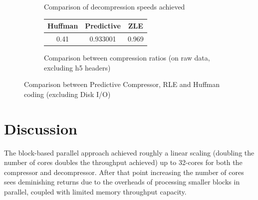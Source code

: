 \begin{figure}[ht!]
\begin{mdframed}
\begin{subfigure}[b]{0.6\textwidth}
  \caption{Comparison of decompression speeds achieved}
  \label{SPEED_CONCURRENT_COMPARISON_DECOMPRESSION}
  \end{subfigure}
  
  \begin{subfigure}[b]{0.7\textwidth}
    \centering
    \vspace{20pt}
    \begin{tabular}{|c|c|c|}
      \hline
      Huffman & Predictive & ZLE \\
      \hline
      0.41 & 0.933001 & 0.969\\
      \hline
    \end{tabular}
  \caption{Comparison between compression ratios (on raw data, excluding h5 headers)}
  \label{RATIO_CONCURRENT_COMPARISON}  
  \end{subfigure}
  
  \caption{Comparison between Predictive Compressor, RLE and Huffman coding (excluding Disk I/O)}
  \label{CONCURRENT_WORK}
  \end{mdframed}
\end{figure}
\section{Discussion}
The block-based parallel approach achieved roughly a linear scaling (doubling the number of cores doubles the throughput achieved) up to 32-cores for both the compressor and decompressor. 
After that point increasing the number of cores sees deminishing returns due to the overheads of processing smaller blocks in parallel, coupled with limited memory throughput capacity. 

